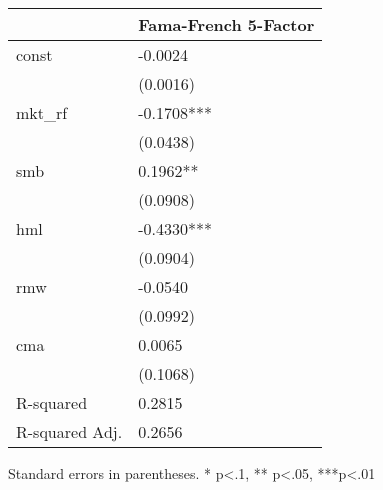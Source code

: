 \begin{table}
\caption{}
\label{}
\begin{center}
\begin{tabular}{ll}
\hline
               & Fama-French 5-Factor  \\
\hline
const          & -0.0024               \\
               & (0.0016)              \\
mkt\_rf        & -0.1708***            \\
               & (0.0438)              \\
smb            & 0.1962**              \\
               & (0.0908)              \\
hml            & -0.4330***            \\
               & (0.0904)              \\
rmw            & -0.0540               \\
               & (0.0992)              \\
cma            & 0.0065                \\
               & (0.1068)              \\
R-squared      & 0.2815                \\
R-squared Adj. & 0.2656                \\
\hline
\end{tabular}
\end{center}
\end{table}
\bigskip
Standard errors in parentheses. \newline 
* p<.1, ** p<.05, ***p<.01